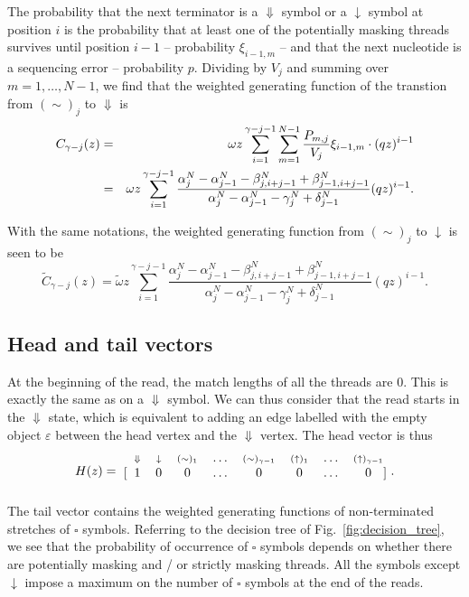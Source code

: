 \documentclass{article}
\newcommand{\DN}{\scriptstyle{\Downarrow}}
\newcommand{\dn}{\scriptstyle{\downarrow}}
\newcommand{\up}[1]{\scriptstyle{(\uparrow)_{#1}}}
\newcommand{\eq}[1]{\scriptstyle{(\sim)_{#1}}}
\begin{document}
The probability that the next terminator is a $\Downarrow$ symbol or a
$\downarrow$ symbol at position $i$ is the probability that at least one
of the potentially masking threads survives until position $i-1$ --
probability $\xi_{i-1,m}$ -- and that the next nucleotide is a sequencing
error -- probability $p$. Dividing by $V_j$ and summing over $m = 1,
\ldots, N-1$, we find that the weighted generating function of the
transtion from $(\sim)_j$ to
$\Downarrow$ is
\begin{eqnarray}
C_{\gamma-j}(z) &=& \omega z \sum_{i=1}^{\gamma-j-1} \sum_{m=1}^{N-1}
  \frac{P_{m,j}}{V_j} \xi_{i-1,m} \cdot (qz)^{i-1} \notag \\
  &=& \omega z \sum_{i=1}^{\gamma-j-1}
\frac{ \alpha_j^N-\alpha_{j-1}^N-\beta_{j,i+j-1}^N
  +\beta_{j-1,i+j-1}^N }
{\alpha_j^N-\alpha_{j-1}^N-\gamma_j^N+\delta_{j-1}^N} (qz)^{i-1}.
\end{eqnarray}

With the same notations, the weighted generating function from $(\sim)_j$
to $\downarrow$ is seen to be 
\begin{equation}
\tilde{C}_{\gamma-j}(z) = \tilde{\omega} z \sum_{i=1}^{\gamma-j-1}
\frac{ \alpha_j^N-\alpha_{j-1}^N-\beta_{j,i+j-1}^N
  +\beta_{j-1,i+j-1}^N }
{\alpha_j^N-\alpha_{j-1}^N-\gamma_j^N+\delta_{j-1}^N} (qz)^{i-1}.
\end{equation}

\subsection{Head and tail vectors}

At the beginning of the read, the match lengths of all the threads are
$0$. This is exactly the same as on a $\Downarrow$ symbol. We can thus
consider that the read starts in the $\Downarrow$ state, which is
equivalent to adding an edge labelled with the empty object $\varepsilon$
between the head vertex and the $\Downarrow$ vertex. The head vector is
thus
\begin{equation*}
H(z) = 
\begin{blockarray}{cccccccc}
   \;\; \DN & \dn &\eq{1} & \ldots & \eq{\gamma-1} &
    \up{1} & \ldots & \up{\gamma-1} \\
\begin{block}{[cccccccc]}
\;\; 1 & 0 & 0 & \ldots & 0 & 0 & \ldots & 0 \\
\end{block}
\end{blockarray}.
\end{equation*}
The tail vector contains the weighted generating functions of
non-terminated stretches of $\square$ symbols. Referring to the decision
tree of Fig.~\ref{fig:decision_tree}, we see that the probability of
occurrence of $\square$ symbols depends on whether there are potentially
masking and / or strictly masking threads. All the symbols except
$\downarrow$ impose a maximum on the number of $\square$ symbols at the
end of the reads.
\end{document}
